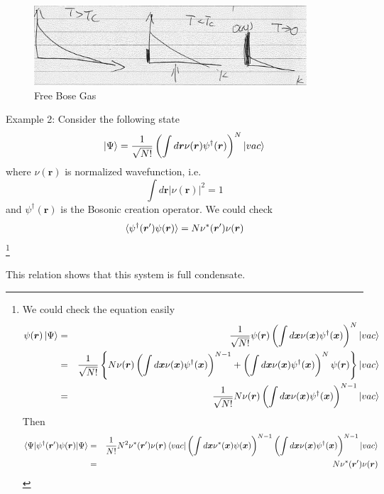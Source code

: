 \begin{figure}[htbp]
\centering
\includegraphics[width=4in]{image/1-5-free_bose.pdf} 
\caption{Free Bose Gas}
\label{fig:1-5}
\end{figure}

Example 2: Consider the following state
\begin{equation}
\ket{\Psi} = \frac{1}{\sqrt{N!}}\left(\int d\bm r \nu(\bm r) \psi^\dag(\bm r)\right)^N\ket{vac}
\end{equation}
where $\nu(\bm r)$ is normalized wavefunction, i.e.
\begin{equation}
\int d\bm r |\nu(\bm r)|^2 = 1
\end{equation}
and $\psi^\dag(\bm r)$ is the Bosonic creation operator.
We could check
\begin{equation}
\braket{\psi^\dag(\bm r') \psi(\bm r)} = N \nu^*(\bm r')\nu(\bm r)
\end{equation}
\footnote{We could check the equation easily
\begin{eqnarray}
\psi(\bm r) \ket{\Psi} &=& \frac{1}{\sqrt{N!}} \psi(\bm r)\left(\int d\bm x \nu(\bm x) \psi^\dag(\bm x)\right)^N\ket{vac}\notag\\
&=& \frac{1}{\sqrt{N!}} \left\{N \nu(\bm r) \left(\int d\bm x \nu(\bm x) \psi^\dag(\bm x)\right)^{N-1}+\left(\int d\bm x \nu(\bm x) \psi^\dag(\bm x)\right)^N\psi(\bm r)\right\} \ket{vac}\notag\\
&=&\frac{1}{\sqrt{N!}}N \nu(\bm r) \left(\int d\bm x \nu(\bm x) \psi^\dag(\bm x)\right)^{N-1} \ket{vac}\notag
\end{eqnarray}
Then
\begin{eqnarray}
\braket{\Psi|\psi^\dag(\bm r') \psi(\bm r)|\Psi} &=& \frac{1}{N!} N^2 \nu^*(\bm r')\nu(\bm r)\braket{vac|\left(\int d\bm x \nu^*(\bm x) \psi(\bm x)\right)^{N-1} \left(\int d\bm x \nu(\bm x) \psi^\dag(\bm x)\right)^{N-1} |vac}\notag\\
&=& N \nu^*(\bm r')\nu(\bm r)\notag
\end{eqnarray}
}

This relation shows that this system is full condensate. 


